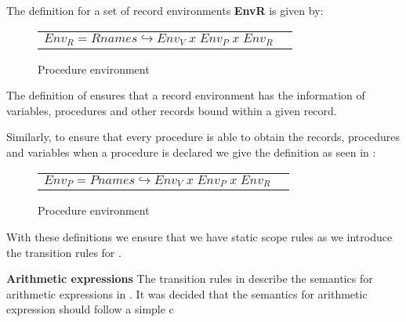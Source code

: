 The definition for a set of record environments \textbf{EnvR} is given by:

\begin{figure}[htbp]
	\centering
	\begin{tabular}{l l}
		$Env_R = Rnames \hookrightarrow Env_V \; x \; Env_P \; x \; Env_R$
	\end{tabular}
	\caption{Procedure environment}
	\label{fig:EnvRDef}
\end{figure}

The definition of  ensures that a record environment has the information of variables, procedures and other records bound within a given record.

Similarly, to ensure that every procedure is able to obtain the records, procedures and variables when a procedure is declared we give the definition as seen in :

\begin{figure}[htbp]
	\centering
	\begin{tabular}{l l}
		$Env_P = Pnames \hookrightarrow Env_V \; x \; Env_P \; x \; Env_R$
	\end{tabular}
	\caption{Procedure environment}
	\label{fig:EnvPDef}
\end{figure}

With these definitions we ensure that we have static scope rules as we introduce the transition rules for \dazel{}.

\textbf{Arithmetic expressions}
The transition rules in  describe the semantics for arithmetic expressions in \dazel{}. It was decided that the semantics for arithmetic expression should follow a simple c


